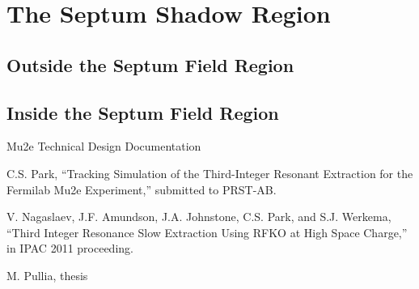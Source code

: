 \documentclass[aps,prstab,onecolumn,preprint,endfloats,11pt]{revtex4-1}
\begin{document}


\appendix

\section{\label{sec:shadow}The Septum Shadow Region}

\subsection{Outside the Septum Field Region}

\subsection{Inside the Septum Field Region}


\begin{thebibliography}{77}

  Mu2e Technical Design Documentation

  C.S. Park, ``Tracking Simulation of the Third-Integer Resonant Extraction for the Fermilab Mu2e Experiment,'' submitted to PRST-AB.

  V. Nagaslaev, J.F. Amundson, J.A. Johnstone, C.S. Park, and S.J. Werkema, ``Third Integer Resonance Slow Extraction Using RFKO at High Space Charge,'' in IPAC 2011 proceeding.

  M. Pullia, thesis

\end{thebibliography}

\clearpage
\end{document}
